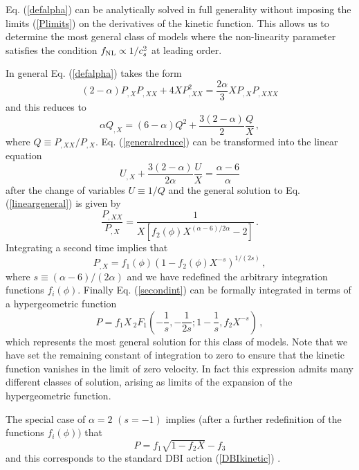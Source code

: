 {Eq. (\ref{defalpha}) can be analytically solved in full 
generality without imposing the limits (\ref{Plimits}) on the 
derivatives of the kinetic function. This allows us to determine the 
most general class of models where the non-linearity parameter 
satisfies the condition $f_{\mathrm{NL}} \propto 1/c_s^2$ at leading order. 

In general Eq. (\ref{defalpha}) takes the form 
\begin{equation}
\label{gengen}
(2-\alpha ) P_{,X}P_{,XX} + 4XP^2_{,XX} = \frac{2\alpha }{3}
X P_{,X}P_{,XXX}
\end{equation}
and this reduces to 
\begin{equation}
\label{generalreduce}
\alpha Q_{,X} = (6-\alpha ) Q^2 + \frac{3(2-\alpha )}{2} \frac{Q}{X} \, ,
\end{equation}
where $Q \equiv P_{,XX}/P_{,X}$. 
Eq. (\ref{generalreduce}) can be transformed into the 
linear equation
\begin{equation}
\label{lineargeneral}
U_{,X}+ \frac{3(2-\alpha )}{2\alpha} \frac{U}{X} = \frac{\alpha -6}{\alpha}
\end{equation}
after the change of variables $U \equiv 1/Q$
and the general solution to Eq. (\ref{lineargeneral}) is given by 
\begin{equation}
\label{gensollinear}
\frac{P_{,XX}}{P_{,X}} = \frac{1}{X\left[ f_2(\phi) X^{(\alpha -6)/2\alpha}
-2 \right] } \, .
\end{equation}
Integrating a second time implies that
\begin{equation}
\label{secondint}
P_{,X} = f_1 (\phi ) \left( 1- f_2(\phi ) X^{-s} \right)^{1/(2s)}  \, ,
\end{equation}
where $s \equiv (\alpha -6 )/(2 \alpha)$ and we have redefined 
the arbitrary integration functions $f_i(\phi )$.  
Finally Eq. (\ref{secondint}) can be formally integrated 
in terms of a hypergeometric function 
\begin{equation}
 \label{thirdint}
 P= f_1X \,{_2}F_1 \left( -\frac{1}{s}, -\frac{1}{2s}; 1-\frac{1}{s}, f_2X^{-s}
\right)  \, ,
\end{equation} 
which represents the most general solution for this class of models. 
Note that we have set the
remaining constant of integration to zero to ensure 
that the kinetic function vanishes in the limit of
zero velocity. In fact this expression admits many 
different classes of solution, arising as limits
of the expansion of the hypergeometric function.

The special case of $\alpha =2$ $(s=-1)$ implies (after a 
further redefinition of the functions $f_i (\phi ))$ that 
\begin{equation}
\label{DBIsolution}
P = f_1 \sqrt{1-f_2 X} -f_3
\end{equation}
and this corresponds to the standard DBI action (\ref{DBIkinetic}) 
\cite{chenetal,lidser2}.          

}
